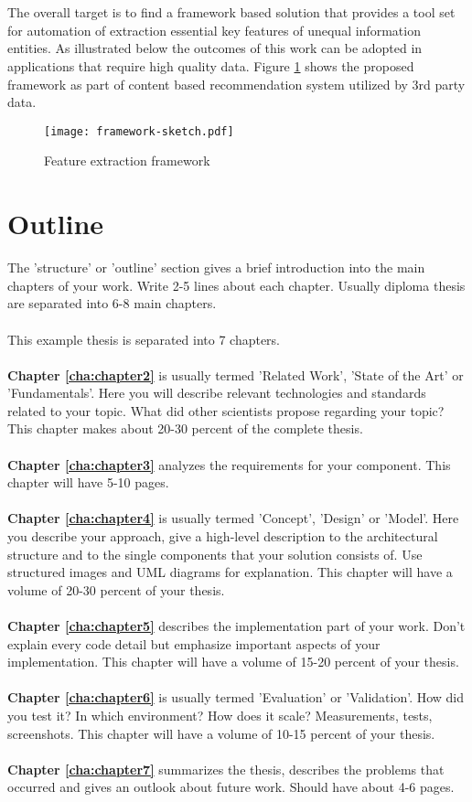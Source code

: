 \\\\
The overall target is to find a framework based solution that provides a tool set for automation of extraction essential key features of unequal information entities. As illustrated below the outcomes of this work can be adopted in applications that require high quality data. Figure \ref{fig:intro} shows the proposed framework as part of content based recommendation system utilized by 3rd party data.
\\
\begin{figure}[htb]
  \centering
  \texttt{[image: framework-sketch.pdf]}\\
  \caption{Feature extraction framework}\label{fig:intro}
\end{figure}

\section{Outline\label{sec:outline}}

The 'structure' or 'outline' section gives a brief introduction into the main chapters of your work. Write 2-5 lines about each chapter. Usually diploma thesis are separated into 6-8 main chapters. 
\\
\\
\noindent This example thesis is separated into 7 chapters.
\\
\\
\textbf{Chapter \ref{cha:chapter2}} is usually termed 'Related Work', 'State of the Art' or 'Fundamentals'. Here you will describe relevant technologies and standards related to your topic. What did other scientists propose regarding your topic? This chapter makes about 20-30 percent of the complete thesis.
\\
\\
\textbf{Chapter \ref{cha:chapter3}} analyzes the requirements for your component. This chapter will have 5-10 pages.
\\
\\
\textbf{Chapter \ref{cha:chapter4}} is usually termed 'Concept', 'Design' or 'Model'. Here you describe your approach, give a high-level description to the architectural structure and to the single components that your solution consists of. Use structured images and UML diagrams for explanation. This chapter will have a volume of 20-30 percent of your thesis.
\\
\\
\textbf{Chapter \ref{cha:chapter5}} describes the implementation part of your work. Don't explain every code detail but emphasize important aspects of your implementation. This chapter will have a volume of 15-20 percent of your thesis.
\\
\\
\textbf{Chapter \ref{cha:chapter6}} is usually termed 'Evaluation' or 'Validation'. How did you test it? In which environment? How does it scale? Measurements, tests, screenshots. This chapter will have a volume of 10-15 percent of your thesis.
\\
\\
\textbf{Chapter \ref{cha:chapter7}} summarizes the thesis, describes the problems that occurred and gives an outlook about future work. Should have about 4-6 pages.